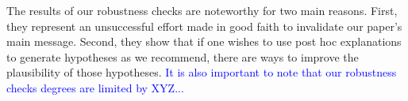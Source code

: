 \documentclass[mnsc,blindrev]{informs3}
\begin{document}
            The results of our robustness checks are noteworthy for two main reasons. First, they represent an unsuccessful effort made in good faith to invalidate our paper's main message. Second, they show that if one wishes to use post hoc explanations to generate hypotheses as we recommend, there are ways to improve the plausibility of those hypotheses. \textcolor{blue}{It is also important to note that our robustness checks degrees are limited by XYZ...}
             

            
\end{document}
